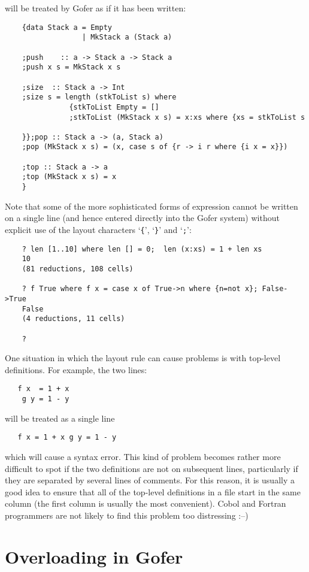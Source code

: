 will be treated by Gofer as if it has been written:
\begin{verbatim}
    {data Stack a = Empty
                  | MkStack a (Stack a)

    ;push    :: a -> Stack a -> Stack a
    ;push x s = MkStack x s

    ;size  :: Stack a -> Int
    ;size s = length (stkToList s) where
               {stkToList Empty = []
               ;stkToList (MkStack x s) = x:xs where {xs = stkToList s

    }};pop :: Stack a -> (a, Stack a)
    ;pop (MkStack x s) = (x, case s of {r -> i r where {i x = x}})

    ;top :: Stack a -> a
    ;top (MkStack x s) = x
    }
\end{verbatim}
Note that some of the more sophisticated forms of expression cannot  be
written on a single line (and hence entered  directly  into  the  Gofer
system) without explicit use of the layout characters 
`\verb"{"', `\verb"}"' and `\verb";"':
\begin{verbatim}
    ? len [1..10] where len [] = 0;  len (x:xs) = 1 + len xs
    10
    (81 reductions, 108 cells)

    ? f True where f x = case x of True->n where {n=not x}; False->True
    False
    (4 reductions, 11 cells)

    ?
\end{verbatim}
One situation in which the layout  rule  can  cause  problems  is  with
top-level definitions.  For example, the two lines:
\begin{verbatim}
   f x  = 1 + x
    g y = 1 - y
\end{verbatim}
will be treated as a single line 
\begin{verbatim}
   f x = 1 + x g y = 1 - y
\end{verbatim}
which  will
cause a syntax  error.   This  kind  of  problem  becomes  rather  more
difficult to spot if the two definitions are not on  subsequent  lines,
particularly if they are separated by several lines of  comments.   For
this reason, it is usually a good  idea  to  ensure  that  all  of  the
top-level definitions in a file start in the  same  column  (the  first
column is usually the most convenient).  {\sc Cobol} and Fortran  programmers
are not likely to find this problem too distressing :--)

\chapter{Overloading in Gofer}

